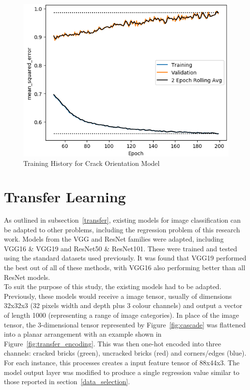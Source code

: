 \begin{figure}[!ht]
	\centering
	\includegraphics[scale=0.7]{Figures/train_history_ori.png}
	\caption{Training History for Crack Orientation Model }
	\label{fig:history_ori}
\end{figure}

\section{Transfer Learning}


As outlined in subsection~\ref{transfer}, existing models for image classification can be adapted to other problems, including the regression problem of this research work. Models from the VGG and ResNet families were adapted, including VGG16 \& VGG19 and ResNet50 \& ResNet101. These were trained and tested using the standard datasets used previously. It was found that VGG19 performed the best out of all of these methods, with VGG16 also performing better than all ResNet models.
\\

\noindent
To suit the purpose of this study, the existing models had to be adapted. Previously, these models would receive a image tensor, usually of dimensions 32x32x3 (32 pixels width and depth plus 3 colour channels) and output a vector of length 1000 (representing a range of image categories). In place of the image tensor, the 3-dimensional tensor represented by Figure~\ref{fig:cascade} was flattened into a planar arrangement with an example shown in Figure~\ref{fig:transfer_encoding}. This was then one-hot encoded into three channels: cracked bricks (green), uncracked bricks (red) and corners/edges (blue). For each instance, this processes creates a input feature tensor of 88x44x3. The model output layer was modified to produce a single regression value similar to those reported in section~\ref{data_selection}.
\\

